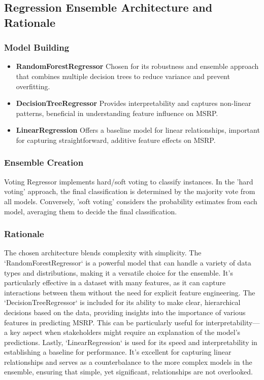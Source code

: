 \documentclass{article}
\begin{document}
\subsection{Regression Ensemble Architecture and Rationale}

\subsubsection{Model Building}
\begin{itemize}
\item \textbf{RandomForestRegressor} Chosen for its robustness and ensemble approach that combines multiple decision trees to reduce variance and prevent overfitting.
\\
\item \textbf{DecisionTreeRegressor} Provides interpretability and captures non-linear patterns, beneficial in understanding feature influence on MSRP.
\\
\item \textbf{LinearRegression} Offers a baseline model for linear relationships, important for capturing straightforward, additive feature effects on MSRP.

\end{itemize}
\subsubsection{Ensemble Creation}
Voting Regressor implements hard/soft voting to classify instances. In the 'hard voting' approach, the final classification is determined by the majority vote from all models. Conversely, 'soft voting' considers the probability estimates from each model, averaging them to decide the final classification.

\subsubsection{Rationale}
The chosen architecture blends complexity with simplicity. The `RandomForestRegressor` is a powerful model that can handle a variety of data types and distributions, making it a versatile choice for the ensemble. It's particularly effective in a dataset with many features, as it can capture interactions between them without the need for explicit feature engineering. 
\newline 
\newline
The `DecisionTreeRegressor` is included for its ability to make clear, hierarchical decisions based on the data, providing insights into the importance of various features in predicting MSRP. This can be particularly useful for interpretability—a key aspect when stakeholders might require an explanation of the model's predictions. Lastly, `LinearRegression` is used for its speed and interpretability in establishing a baseline for performance. It’s excellent for capturing linear relationships and serves as a counterbalance to the more complex models in the ensemble, ensuring that simple, yet significant, relationships are not overlooked.
\end{document}
